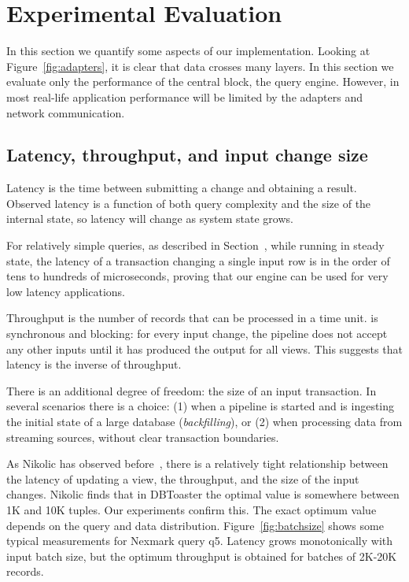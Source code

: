 \section{Experimental Evaluation}\label{sec:experiments}

\newcommand{\query}[1]{\textsf{#1}}

In this section we quantify some aspects of our implementation.
Looking at Figure~\ref{fig:adapters}, it is clear that data crosses
many layers.  In this section we evaluate only the performance of
the central block, the \dbsp query engine.  However, in most real-life
application performance will be limited by the adapters and network
communication.

\subsection{Latency, throughput, and input change size}

Latency is the time between submitting a change and obtaining a
result.  Observed latency is a function of both query complexity and
the size of the internal state, so latency will change as system
state grows.

For relatively simple queries, as described in
Section~, while running in steady state,
the latency of a transaction changing a single input row is in the
order of tens to hundreds of microseconds, proving that our engine can
be used for very low latency applications.

Throughput is the number of records that can be processed in a time
unit.  \dbsp is synchronous and blocking: for every input
change, the pipeline does not accept any other inputs until it has
produced the output for all views.  This suggests that latency is the
inverse of throughput.

There is an additional degree of freedom: the size of an input
transaction.  In several scenarios there is a choice: (1) when a
pipeline is started and is ingesting the initial state of a large
database (\emph{backfilling}), or (2) when processing data from
streaming sources, without clear transaction boundaries.

As Nikolic has observed before~\cite{nikolic-sigmod16}, there is a
relatively tight relationship between the latency of updating a view,
the throughput, and the size of the input changes.  Nikolic finds that
in DBToaster the optimal value is somewhere between 1K and 10K tuples.
Our experiments confirm this.  The exact optimum value depends on the
query and data distribution.  Figure~\ref{fig:batchsize} shows some
typical measurements for Nexmark query \query{q5}.  Latency grows
monotonically with input batch size, but the optimum throughput is
obtained for batches of 2K-20K records.

